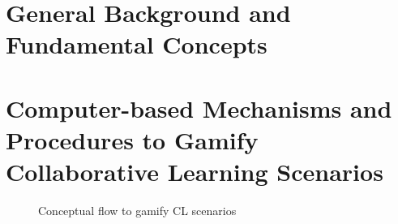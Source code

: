 \documentclass[doutorado, pre-defesa]{packages/icmc}
\begin{document}
\textual

\newcommand{\comando}[1]{\textbf{$\backslash$#1}}




\chapter{General Background and Fundamental Concepts}
\label{chapter:general-background}
%





\chapter[Computer-based Mechanisms and Procedures to Gamify CL Scenarios]{Computer-based Mechanisms and Procedures to Gamify Collaborative Learning Scenarios}
\label{chapter:computer-based-mechanisms-procedures}

\begin{figure}[htb]
 \caption{Conceptual flow to gamify CL scenarios}
 \label{fig:conceptual-flow-gamify-cl-scenarios}
 \centering
 \fautor
\end{figure}




% 

\postextual




%
\end{document}
